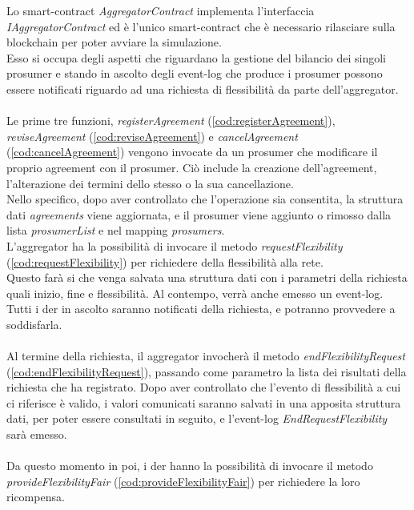 Lo \gls{smart-contract} \textit{AggregatorContract} implementa l'interfaccia \textit{IAggregatorContract}
ed è l'unico \gls{smart-contract} che è necessario rilasciare sulla \gls{blockchain} per poter avviare la simulazione. \\
Esso si occupa degli aspetti che riguardano la gestione del bilancio dei singoli prosumer
e stando in ascolto degli \gls{event-log} che produce i \gls{prosumer} possono essere notificati riguardo ad una richiesta di flessibilità da parte dell'\gls{aggregator}. \\
\\
Le prime tre funzioni, \textit{registerAgreement} (\autoref{cod:registerAgreement}), \textit{reviseAgreement} (\autoref{cod:reviseAgreement}) e \textit{cancelAgreement} (\autoref{cod:cancelAgreement}) vengono invocate da un \gls{prosumer} che modificare il proprio \gls{agreement} con il \gls{prosumer}.
Ciò include la creazione dell'\gls{agreement}, l'alterazione dei termini dello stesso o la sua cancellazione. \\
Nello specifico, dopo aver controllato che l'operazione sia consentita, la struttura dati \textit{agreements} viene aggiornata,
e il prosumer viene aggiunto o rimosso dalla lista \textit{prosumerList} e nel mapping \textit{prosumers}.
\\
L'\gls{aggregator} ha la possibilità di invocare il metodo \textit{requestFlexibility} (\autoref{cod:requestFlexibility}) per richiedere della flessibilità alla rete. \\
Questo farà si che venga salvata una struttura dati con i parametri della richiesta quali inizio, fine e flessibilità.
Al contempo, verrà anche emesso un \gls{event-log}.
Tutti i \gls{der} in ascolto saranno notificati della richiesta, e potranno provvedere a soddisfarla. \\
\\
Al termine della richiesta, il \gls{aggregator} invocherà il metodo \textit{endFlexibilityRequest} (\autoref{cod:endFlexibilityRequest}), passando come parametro la lista dei risultati della richiesta che ha registrato.
Dopo aver controllato che l'evento di flessibilità a cui ci riferisce è valido, i valori comunicati saranno salvati in una apposita struttura dati, per poter essere consultati in seguito,
e l'\gls{event-log} \textit{EndRequestFlexibility} sarà emesso. \\
\\
Da questo momento in poi, i \gls{der} hanno la possibilità di invocare il metodo \textit{provideFlexibilityFair} (\autoref{cod:provideFlexibilityFair}) per richiedere la loro ricompensa. \\
